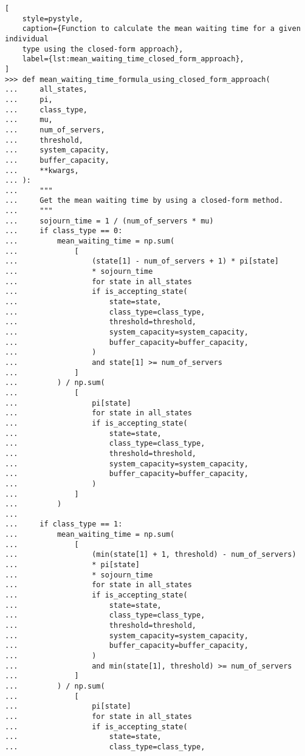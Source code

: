 \begin{lstlisting}[
    style=pystyle,
    caption={Function to calculate the mean waiting time for a given individual
    type using the closed-form approach},
    label={lst:mean_waiting_time_closed_form_approach},
]
>>> def mean_waiting_time_formula_using_closed_form_approach(
...     all_states,
...     pi,
...     class_type,
...     mu,
...     num_of_servers,
...     threshold,
...     system_capacity,
...     buffer_capacity,
...     **kwargs,
... ):
...     """
...     Get the mean waiting time by using a closed-form method.
...     """
...     sojourn_time = 1 / (num_of_servers * mu)
...     if class_type == 0:
...         mean_waiting_time = np.sum(
...             [
...                 (state[1] - num_of_servers + 1) * pi[state]
...                 * sojourn_time
...                 for state in all_states
...                 if is_accepting_state(
...                     state=state,
...                     class_type=class_type,
...                     threshold=threshold,
...                     system_capacity=system_capacity,
...                     buffer_capacity=buffer_capacity,
...                 )
...                 and state[1] >= num_of_servers
...             ]
...         ) / np.sum(
...             [
...                 pi[state]
...                 for state in all_states
...                 if is_accepting_state(
...                     state=state,
...                     class_type=class_type,
...                     threshold=threshold,
...                     system_capacity=system_capacity,
...                     buffer_capacity=buffer_capacity,
...                 )
...             ]
...         )
...
...     if class_type == 1:
...         mean_waiting_time = np.sum(
...             [
...                 (min(state[1] + 1, threshold) - num_of_servers)
...                 * pi[state]
...                 * sojourn_time
...                 for state in all_states
...                 if is_accepting_state(
...                     state=state,
...                     class_type=class_type,
...                     threshold=threshold,
...                     system_capacity=system_capacity,
...                     buffer_capacity=buffer_capacity,
...                 )
...                 and min(state[1], threshold) >= num_of_servers
...             ]
...         ) / np.sum(
...             [
...                 pi[state]
...                 for state in all_states
...                 if is_accepting_state(
...                     state=state,
...                     class_type=class_type,

\end{lstlisting}
